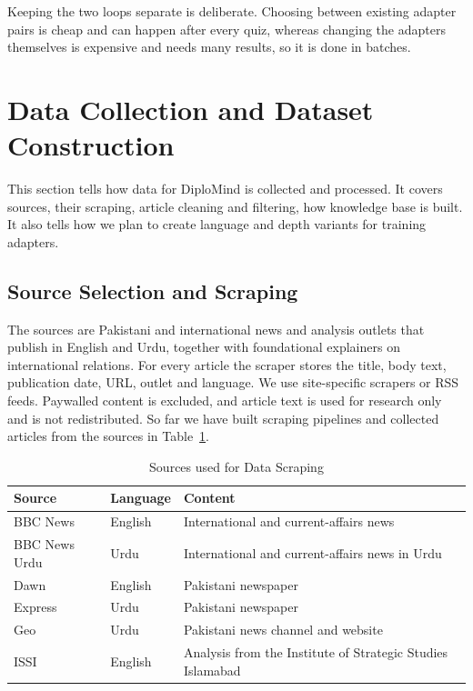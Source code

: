 \documentclass{FastFyp}
\begin{document}
Keeping the two loops separate is deliberate. Choosing between existing adapter pairs is cheap and can happen after every quiz, whereas changing the adapters themselves is expensive and needs many results, so it is done in batches.

\section{Data Collection and Dataset Construction}
\label{sec:data-collection}
This section tells how data for DiploMind is collected and processed. It covers sources, their scraping, article cleaning and filtering, how knowledge base is built. It also tells how we plan to create language and depth variants for training adapters.

\subsection{Source Selection and Scraping}
The sources are Pakistani and international news and analysis outlets that publish in English and Urdu, together with foundational explainers on international relations. For every article the scraper stores the title, body text, publication date, URL, outlet and language. We use site-specific scrapers or RSS feeds. Paywalled content is excluded, and article text is used for research only and is not redistributed. So far we have built scraping pipelines and collected articles from the sources in Table~\ref{tab:sources}.

\begin{table}[!ht]
\centering
\caption{Sources used for Data Scraping}
\label{tab:sources}
\small
\begin{tabular}{|p{3.6cm}|p{3.4cm}|p{6.6cm}|}
\hline
\textbf{Source} & \textbf{Language} & \textbf{Content} \\ \hline
BBC News & English & International and current-affairs news \\ \hline
BBC News Urdu & Urdu & International and current-affairs news in Urdu \\ \hline
Dawn & English & Pakistani newspaper \\ \hline
Express & Urdu & Pakistani newspaper \\ \hline
Geo &  Urdu & Pakistani news channel and website \\ \hline
ISSI & English & Analysis from the Institute of Strategic Studies Islamabad \\ \hline
\end{tabular}
\end{table}
\end{document}
